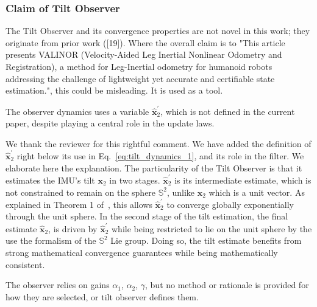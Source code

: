 
\subsubsection{Claim of Tilt Observer}

\begin{revquote}
The Tilt Observer and its convergence properties are not novel in this work; they originate from prior work ([19]). Where the overall claim is to "This article presents VALINOR (Velocity-Aided Leg Inertial Nonlinear Odometry and Registration), a method for Leg-Inertial odometry for humanoid robots addressing the challenge of lightweight yet accurate and certifiable state estimation.", this could be misleading. It is used as a tool.
\end{revquote}

\io

\begin{revquote}
The observer dynamics uses a variable $\hat{\boldsymbol{x}}_{2}^{\prime} $, which is not defined in the current paper, despite playing a central role in the update laws.
\end{revquote}

We thank the reviewer for this rightful comment. We have added the definition of $\hat{\boldsymbol{x}}_{2}^{\prime} $ right below its use in Eq.~\eqref{eq:tilt_dynamics_1}, and its role in the filter. We elaborate here the explanation.
The particularity of the Tilt Observer is that it estimates the IMU's tilt $\boldsymbol{x}_{2}$ in two stages. $\hat{\boldsymbol{x}}_{2}^{\prime} $ is its intermediate estimate, which is not constrained to remain on the sphere $\mathbb{S}^{2}$, unlike $\boldsymbol{x}_{2}$ which is a unit vector. As explained in Theorem 1 of~\cite{benallegue2020LyapunovStableOrientationEstimatorHumanoids}, this allows $\hat{\boldsymbol{x}}_{2}^{\prime} $ to converge globally exponentially through the unit sphere. In the second stage of the tilt estimation, the final estimate $\hat{\boldsymbol{x}}_{2}$, is driven by $\hat{\boldsymbol{x}}_{2}^{\prime}$ while being restricted to lie on the unit sphere by the use the formalism of the $\mathbb{S}^{2}$ Lie group. Doing so, the tilt estimate benefits from strong mathematical convergence guarantees while being mathematically consistent.


\begin{revquote}
The observer relies on gains $\alpha_{1}$, $\alpha_{2}$, $\gamma$, but no method or rationale is provided for how they are selected, or tilt observer defines them.
\end{revquote}

